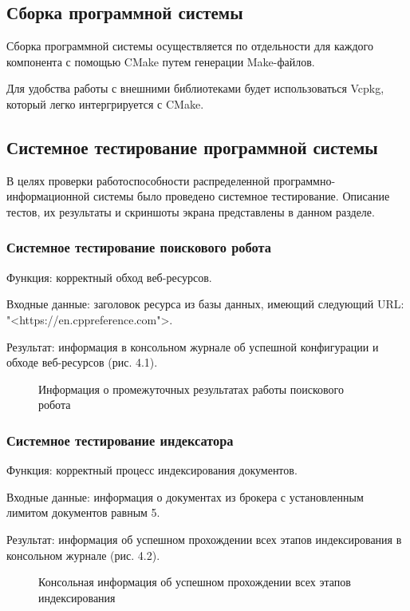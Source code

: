 \subsection{Сборка программной системы}

Сборка программной системы осуществляется по отдельности для каждого компонента с помощью CMake путем генерации Make-файлов.

Для удобства работы с внешними библиотеками будет использоваться Vcpkg, который легко интергрируется с CMake.

\subsection{Системное тестирование программной системы}

В целях проверки работоспособности распределенной программно-информационной системы было проведено системное тестирование. Описание тестов, их результаты и скриншоты экрана представлены в данном разделе.

\subsubsection{Системное тестирование поискового робота}

Функция: корректный обход веб-ресурсов.

Входные данные: заголовок ресурса из базы данных, имеющий следующий URL: "<https://en.cppreference.com">.

Результат: информация в консольном журнале об успешной конфигурации и обходе веб-ресурсов (рис. 4.1).

\begin{figure}[H]
\caption{Информация о промежуточных результатах работы поискового робота}
\label{tests/robot.png:image}
\end{figure}

\subsubsection{Системное тестирование индексатора}
Функция: корректный процесс индексирования документов.

Входные данные: информация о документах из брокера с установленным лимитом документов равным 5. 

Результат: информация об успешном прохождении всех этапов индексирования в консольном журнале (рис. 4.2).

\begin{figure}[H]
\caption{Консольная информация об успешном прохождении всех этапов индексирования}
\label{tests/indexer.png:image}
\end{figure}

